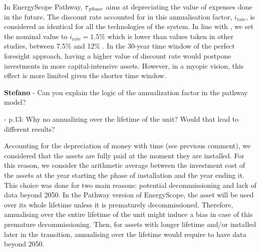 \documentclass[12pt,a4paper]{article}
\begin{document}

\begin{mdframed}[style=manuscript] %
In EnergyScope Pathway, $\tau\textsubscript{\emph{phase}}$ aims at depreciating the value of expenses done in the future. The discount rate accounted for in this annualisation factor, $i_{\text{rate}}$, is considered as identical for all the technologies of the system. In line with \citet{limpens2021generating}, we set the nominal value to $i_{\text{rate}}=1.5\%$ which is lower than values taken in other studies, between 7.5\% and 12\% \cite{meinke2017energy,simoes2013jrc,EuropeanCommission2016}. In the 30-year time window of the perfect foresight approach, having a higher value of discount rate would postpone investments in more capital-intensive assets. However, in a myopic vision, this effect is more limited given the shorter time window. 
\end{mdframed}

\begin{mdframed}[style=comment] %
{\color{orange} \textbf{Stefano}} - Can you explain the logic of the annualization factor in the pathway model?

 - p.13: Why no annualizing over the lifetime of the unit? Would that lead to different results? 
\end{mdframed}

\noindent Accounting for the depreciation of money with time (see previous comment), we considered that the assets are fully paid at the moment they are installed. For this reason, we consider the arithmetic average between the investment cost of the assets at the year starting the phase of installation and the year ending it. This choice was done for two main reasons: potential decommissioning and lack of data beyond 2050. In the Pathway version of EnergyScope, the asset will be used over its whole lifetime unless it is prematurely decommissioned. Therefore, annualising over the entire lifetime of the unit might induce a bias in case of this premature decommissioning. Then, for assets with longer lifetime and/or installed later in the transition, annualising over the lifetime would require to have data beyond 2050.
\end{document}

